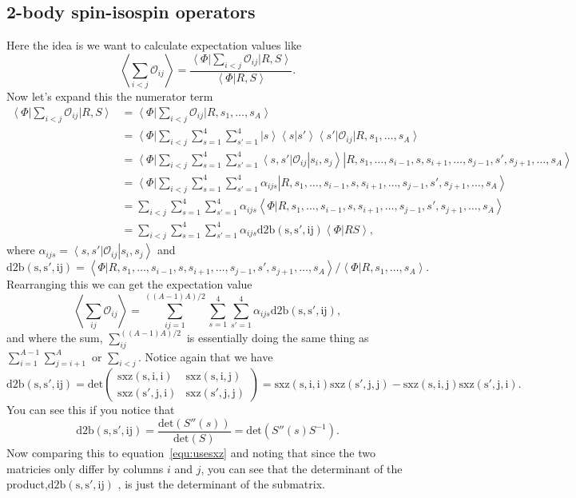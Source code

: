 \documentclass[12pt]{extarticle}
\newcommand{\Oij}{\mathcal{O}_{ij}}
\newcommand{\ket}[1]{\left| #1 \right>}
\newcommand{\bra}[1]{\left< #1 \right|}
\newcommand{\braket}[2]{\left< #1 | #2 \right>}
\newcommand{\longsij}{s_1, \ldots, s_{i-1} , s, s_{i+1}, \ldots, s_{j-1}, s', s_{j+1}, \ldots ,s_A}
\begin{document}
\subsection{2-body spin-isospin operators}
Here the idea is we want to calculate expectation values like
\begin{equation}
 \left< \sum_{i<j} \Oij \right> = \frac{\bra{\Phi} \sum\limits_{i<j} \Oij \ket{R,S}}{\braket{\Phi}{R,S}}.
\end{equation}
Now let's expand this the numerator term
\begin{align}
  \bra{\Phi} \sum_{i<j} \Oij \ket{R,S} &= \bra{\Phi} \sum_{i<j} \Oij \ket{R,s_1,\ldots,s_A} \\
  &= \bra{\Phi} \sum_{i<j}\sum_{s=1}^4\sum_{s'=1}^4  \ket{s}\braket{s}{s'}\bra{s'} \Oij \ket{R,s_1,\ldots,s_A} \\
  &= \bra{\Phi} \sum_{i<j}\sum_{s=1}^4\sum_{s'=1}^4  \bra{s,s'}\Oij\ket{s_i,s_j} \ket{R,\longsij} \\
  &= \bra{\Phi} \sum_{i<j}\sum_{s=1}^4\sum_{s'=1}^4 \alpha_{ijs} \ket{R,\longsij} \\
  &= \sum_{i<j}\sum_{s=1}^4\sum_{s'=1}^4 \alpha_{ijs} \braket{\Phi}{R,\longsij} \\
  &= \sum_{i<j}\sum_{s=1}^4\sum_{s'=1}^4 \alpha_{ijs} \mathrm{d2b(s,s',ij)} \braket{\Phi}{RS},
\end{align}
where $\alpha_{ijs} = \bra{s,s'} \Oij \ket{s_i,s_j}$ and
\begin{equation}
  \mathrm{d2b(s,s',ij)} = \braket{\Phi}{R,\longsij}/\braket{\Phi}{R,s_1,\ldots,s_A}.
\end{equation}
Rearranging this we can get the expectation value
\begin{equation}
  \left< \sum_{ij} \Oij \right> = \sum_{ij=1}^{((A-1)A)/2}\sum_{s=1}^4\sum_{s'=1}^4 \alpha_{ijs}\mathrm{d2b(s,s',ij)},
\end{equation}
and where the sum, $\sum\limits_{ij}^{((A-1)A)/2}$ is essentially doing the same thing as $\sum\limits_{i=1}^{A-1}\sum\limits_{j=i+1}^{A}$ or $\sum\limits_{i<j}$.
Notice again that we have
\begin{equation}
  \mathrm{d2b(s,s',ij)} = \mathrm{det} \begin{pmatrix}
  \mathrm{sxz(s,i,i)} & \mathrm{sxz(s,i,j)} \\
  \mathrm{sxz(s',j,i)} & \mathrm{sxz(s',j,j)} \end{pmatrix}
  =\mathrm{sxz(s,i,i)sxz(s',j,j) - sxz(s,i,j)sxz(s',j,i)}.
\end{equation}
You can see this if you notice that
\begin{equation}
  \mathrm{d2b(s,s',ij)} = \frac{\mathrm{det}(S''(s))}{\mathrm{det}(S)} = \mathrm{det}\left(S''(s)S^{-1}\right).
\end{equation}
Now comparing this to equation~\ref{equ:usesxz} and noting that since the two matricies only differ by columns $i$ and $j$, you can see that the determinant of the product,$\mathrm{d2b(s,s',ij)}$ , is just the determinant of the submatrix.
\end{document}
